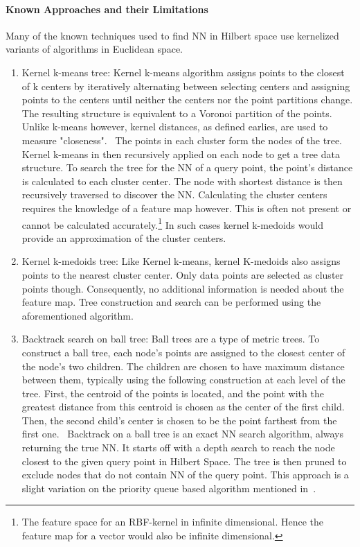 \documentclass[11pt]{article}
\begin{document}
\paragraph*{Known Approaches and their Limitations} Many of the known techniques used to find NN in Hilbert space use kernelized variants of algorithms in Euclidean space.
\begin{enumerate}
\item Kernel k-means tree: Kernel k-means algorithm assigns points to the closest of k centers by iteratively alternating between selecting centers and assigning points to the centers until neither the centers nor the point partitions change. The resulting structure is equivalent to a Voronoi partition of the points. Unlike k-means however, kernel distances, as defined earlies, are used to measure "closeness".~\cite{Nayar08} The points in each cluster form the nodes of the tree. Kernel k-means in then recursively applied on each node to get a tree data structure. To search the tree for the NN of a query point, the point's distance is calculated to each cluster center. The node with shortest distance is then recursively traversed to discover the NN. Calculating the cluster centers requires the knowledge of a feature map however. This is often not present or cannot be calculated accurately.\footnote{The feature space for an RBF-kernel in infinite dimensional. Hence the feature map for a vector would also be infinite dimensional.} In such cases kernel k-medoids would provide an approximation of the cluster centers. 
\item Kernel k-medoids tree: Like Kernel k-means, kernel K-medoids also assigns points to the nearest cluster center. Only data points are selected as cluster points though. Consequently, no additional information is needed about the feature map. Tree construction and search can be performed using the aforementioned algorithm. 
\item Backtrack search on ball tree: Ball trees are a type of metric trees. To construct a ball tree, each node’s points are assigned to the closest center of the node’s two children. The children are chosen to have maximum distance between them, typically using the following construction at each level of the tree. First, the centroid of the points is located, and the point with the greatest distance from
this centroid is chosen as the center of the first child. Then, the second child’s center is chosen to be the point farthest from the first one.~\cite{Nayar08} Backtrack on a ball tree is an exact NN search algorithm, always returning the true NN. It starts off with a depth search to reach the node closest to the given query point in Hilbert Space. The tree is then pruned to exclude nodes that do not contain NN of the query point. This approach is a slight variation on the priority queue based algorithm mentioned in~\cite{Yianilos93}.
\end{enumerate}
\end{document}
